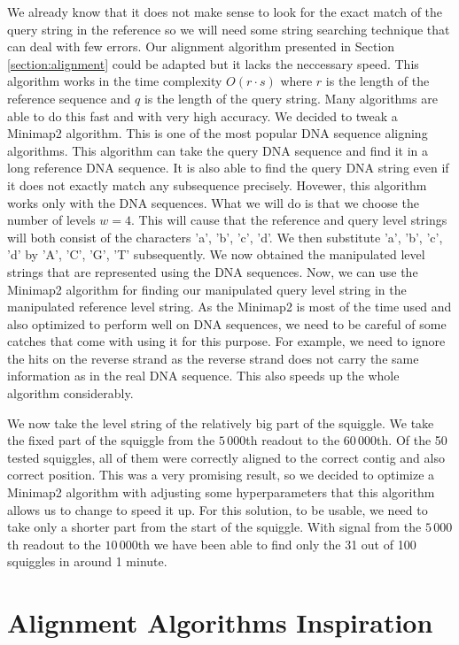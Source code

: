 We already know that it does not make sense to look for the exact match of the query string in the reference
so we will need some string searching technique that can deal with few errors.
Our alignment algorithm presented in Section \ref{section:alignment} could be adapted but it lacks the neccessary speed. This
algorithm works in the time complexity $O(r\cdot s)$ where $r$ is the length of the
reference sequence and $q$ is the length of the query string. Many algorithms are able
to do this fast and with very high accuracy. We decided to tweak a Minimap2 \cite{li2018minimap2} algorithm. This is
one of the most popular DNA sequence aligning algorithms. This algorithm can take the
query DNA sequence and find it in a long reference DNA sequence. It is also able to
find the query DNA string even if it does not exactly match any subsequence precisely.
Hovewer, this algorithm works only with the DNA sequences. What we will do is that we choose
the number of levels $w=4$. This will cause that the reference and query level strings will both consist of
the characters 'a', 'b', 'c', 'd'. We then substitute 'a', 'b', 'c', 'd' by
'A', 'C', 'G', 'T' subsequently. We now obtained the manipulated level strings that
are represented using the DNA sequences. Now, we can use the Minimap2 algorithm for
finding our manipulated query level string in the manipulated reference level string.
As the Minimap2 is most of the time used and also optimized to perform well on DNA
sequences, we need to be careful of some catches that come with using it for this
purpose. For example, we need to ignore the hits on the reverse strand as the
reverse strand does not carry the same information as in the real DNA sequence.
This also speeds up the whole algorithm considerably.

We now take the level string of the relatively big part of the squiggle. We take the
fixed part of the squiggle from the $5\,000$th readout to the $60\,000$th. Of the 50
tested squiggles, all of them were correctly aligned to the correct contig and also
correct position. This was a very promising result, so we decided to optimize a
Minimap2 algorithm with adjusting some hyperparameters that this algorithm allows us
to change to speed it up. For this solution, to be usable, we need to take only
a shorter part from the start of the squiggle. With signal from the $5\,000$th
readout to the $10\,000$th we have been able to find only the 31 out of 100 squiggles
in around 1 minute.

\section{Alignment Algorithms Inspiration}
\label{section:alignmentAlgorithms}

